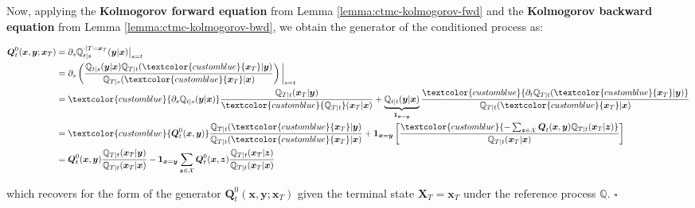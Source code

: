 \documentclass{article}
\newcommand{\bluetext}[1]{\textcolor{customblue}{#1}}
\begin{document}
Now, applying the \textbf{Kolmogorov forward equation} from Lemma \ref{lemma:ctmc-kolmogorov-fwd} and the \textbf{Kolmogorov backward equation} from Lemma \ref{lemma:ctmc-kolmogorov-bwd}, we obtain the generator of the conditioned process as:
\begin{small}
\begin{align}
    \boldsymbol{Q}^0_t(\boldsymbol{x}, \boldsymbol{y};\boldsymbol{x}_T) &=\partial_s\mathbb{Q}^{\cdot|T=\boldsymbol{x}_T}_{t|s}(\boldsymbol{y}|\boldsymbol{x})\big\vert_{s=t}\nonumber\\
    &=\partial_s\left(\frac{\mathbb{Q}_{t|s}(\boldsymbol{y}|\boldsymbol{x})\mathbb{Q}_{T|t}(\bluetext{\boldsymbol{x}_T}|\boldsymbol{y})}{\mathbb{Q}_{T|s}(\bluetext{\boldsymbol{x}_T}|\boldsymbol{x})}\right)\bigg|_{s=t}\nonumber\\
    &=\bluetext{\partial_s\mathbb{Q}_{t|s}(\boldsymbol{y}|\boldsymbol{x})}\frac{\mathbb{Q}_{T|t}(\boldsymbol{x}_T|\boldsymbol{y})}{\bluetext{\mathbb{Q}_{T|t}}(\boldsymbol{x}_T|\boldsymbol{x})}+\underbrace{\mathbb{Q}_{t|t}(\boldsymbol{y}|\boldsymbol{x})}_{\boldsymbol{1}_{\boldsymbol{x}=\boldsymbol{y}}}\frac{\bluetext{\partial_t\mathbb{Q}_{T|t}(\bluetext{\boldsymbol{x}_T}|\boldsymbol{y})}}{\mathbb{Q}_{T|t}(\bluetext{\boldsymbol{x}_T}|\boldsymbol{x})}\nonumber\\
    &=\bluetext{\boldsymbol{Q}_t^0(\boldsymbol{x}, \boldsymbol{y})}\frac{\mathbb{Q}_{T|t}(\bluetext{\boldsymbol{x}_T}|\boldsymbol{y})}{\mathbb{Q}_{T|t}(\bluetext{\boldsymbol{x}_T}|\boldsymbol{x})}+\boldsymbol{1}_{\boldsymbol{x}=\boldsymbol{y}}\left[\frac{\bluetext{-\sum_{\boldsymbol{z}\in\mathcal{X}}\boldsymbol{Q}_t(\boldsymbol{x}, \boldsymbol{y})\mathbb{Q}_{T|t}(\boldsymbol{x}_T|\boldsymbol{z})}}{\mathbb{Q}_{T|t}(\boldsymbol{x}_T|\boldsymbol{x})}\right]\nonumber\\
    &=\boldsymbol{Q}^0_t(\boldsymbol{x},\boldsymbol{y})\frac{\mathbb{Q}_{T|t}( \boldsymbol{x}_T|\boldsymbol{y})}{\mathbb{Q}_{T|t}( \boldsymbol{x}_T|\boldsymbol{x})}-\boldsymbol{1}_{\boldsymbol{x}=\boldsymbol{y}}\sum_{\boldsymbol{z}\in \mathcal{X}}\boldsymbol{Q}^0_t(\boldsymbol{x}, \boldsymbol{z})\frac{\mathbb{Q}_{T|t}(\boldsymbol{x}_T|\boldsymbol{z})}{\mathbb{Q}_{T|t}(\boldsymbol{x}_T|\boldsymbol{x})}
\end{align}
\end{small}
which recovers for the form of the generator $\boldsymbol{Q}^0_t(\boldsymbol{x}, \boldsymbol{y} ; \boldsymbol{x}_T)$ given the terminal state $\boldsymbol{X}_T=\boldsymbol{x}_T$ under the reference process $\mathbb{Q}$. \hfill $\square$
\end{document}
